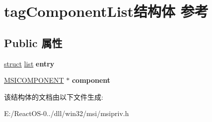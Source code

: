 \hypertarget{structtag_component_list}{}\section{tag\+Component\+List结构体 参考}
\label{structtag_component_list}
\subsection*{Public 属性}
\begin{DoxyCompactItemize}
\item 
\mbox{\label{structtag_component_list_a4ded0d61cdffd623bb0d1673db009515}} 
\hyperlink{interfacestruct}{struct} \hyperlink{classlist}{list} {\bfseries entry}
\item 
\mbox{\label{structtag_component_list_a8595e3268084ea05f0646d4780b78480}} 
\hyperlink{structtag_m_s_i_c_o_m_p_o_n_e_n_t}{M\+S\+I\+C\+O\+M\+P\+O\+N\+E\+NT} $\ast$ {\bfseries component}
\end{DoxyCompactItemize}


该结构体的文档由以下文件生成\+:\begin{DoxyCompactItemize}
\item 
E\+:/\+React\+O\+S-\/0../dll/win32/msi/msipriv.\+h\end{DoxyCompactItemize}
